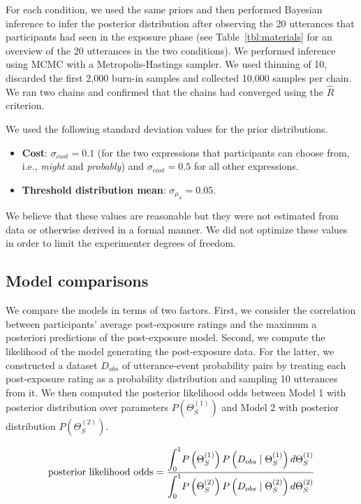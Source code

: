 \documentclass[lucida,biblatex]{sp} %
\begin{document}
For each condition, we used the same priors and then performed Bayesian inference to infer the posterior distribution after observing the 20 utterances that participants had seen in the exposure phase (see Table~\ref{tbl:materials} for an overview of the 20 utterances in the two conditions). We performed inference using MCMC with a Metropolis-Hastings sampler. We used thinning of 10, discarded the first 2,000 burn-in samples and collected 10,000 samples per chain. We ran two chains and confirmed that the chains had converged using the $\hat{R}$ criterion. 

We used the following standard deviation values for the prior distributions.
\begin{itemize}
\item \textbf{Cost}: $\sigma_{cost} = 0.1$ (for the two expressions that participants can choose from, i.e., \textit{might} and \textit{probably}) and $\sigma_{cost} = 0.5$ for all other expressions.
\item \textbf{Threshold distribution mean}: $\sigma_{\mu_u} = 0.05$.
\end{itemize}

\noindent We believe that these values are reasonable but they were not estimated from data or otherwise derived in a formal manner. We
did not optimize these values in order to limit the experimenter degrees of freedom.


\subsection{Model comparisons}

We compare the models in terms of two factors. First, we consider the correlation between participants' average post-exposure ratings and the maximum a posteriori predictions of the post-exposure model. Second, we compute the likelihood of the model generating the post-exposure data. For the latter, we constructed a dataset $D_{obs}$ of utterance-event probability pairs by treating each post-exposure rating as a probability distribution and sampling 10 utterances from it. We then computed the posterior likelihood odds between Model 1 with posterior distribution over parameters $P(\Theta_{S}^{(1)})$ and Model 2 with posterior distribution $P(\Theta_{S}^{(2)})$.

$$\mbox{posterior likelihood odds} = \frac{\mathlarger{\int_0^1} {P\left(\Theta_{S}^{(1)}\right) P\left(D_{obs} \mid \Theta_{S}^{(1)} \right) d   \Theta_{S}^{(1)}}}{\mathlarger{\int_0^1} P\left(\Theta_{S}^{(2)}\right) P\left(D_{obs} \mid \Theta_{S}^{(2)}\right)d   \Theta_{S}^{(2)} }$$
 
\end{document}
